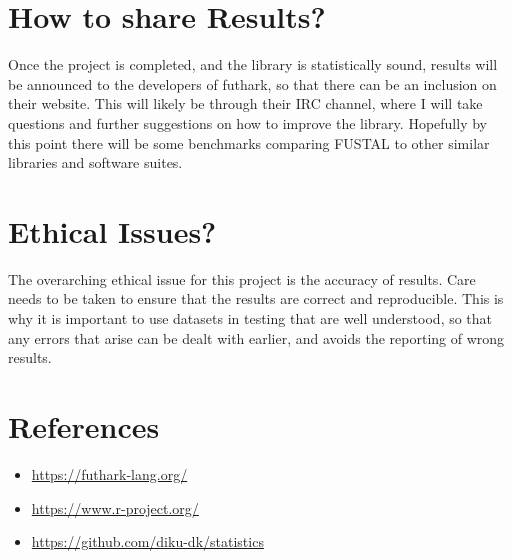 \documentclass{article}
\begin{document}
\section{How to share Results?}

Once the project is completed, and the library is statistically sound, results
will be announced to the developers of futhark, so that there can be an inclusion
on their website. This will likely be through their IRC channel, where I will
take questions and further suggestions on how to improve the library. Hopefully
by this point there will be some benchmarks comparing FUSTAL to other similar
libraries and software suites.

\section{Ethical Issues?}

The overarching ethical issue for this project is the accuracy of results.
Care needs to be taken to ensure that the results are correct and reproducible.
This is why it is important to use datasets in testing that are well understood,
so that any errors that arise can be dealt with earlier, and avoids the
reporting of wrong results.

\section{References}

\begin{itemize}
  \item \href{https://futhark-lang.org/}{https://futhark-lang.org/}
  \item \href{https://www.r-project.org/}{https://www.r-project.org/}
  \item \href{https://github.com/diku-dk/statistics}{https://github.com/diku-dk/statistics}
\end{itemize}
\end{document}
